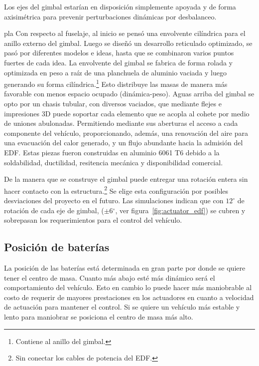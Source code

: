 \medskip 

Los ejes del gimbal estarían en disposición simplemente apoyada y de forma axisimétrica para prevenir perturbaciones dinámicas por desbalanceo.

\medskip
pla
Con respecto al fuselaje, al inicio se pensó una envolvente cilíndrica para el anillo externo del
gimbal. Luego se diseñó un desarrollo reticulado optimizado, se pasó por diferentes modelos e
ideas, hasta que se combinaron varios puntos fuertes de cada idea. La envolvente del gimbal se fabrica de forma rolada y optimizada en peso a raíz de
una planchuela de aluminio vaciada y luego generando su forma cilíndrica.\footnote{Contiene al
anillo del gimbal.} Esto distribuye las masas de manera más favorable con menos espacio
ocupado (dinámica-peso). Aguas arriba del gimbal se opto por un chasis tubular, con diversos
vaciados, que mediante flejes e impresiones 3D puede soportar cada elemento que se acopla al cohete por
medio de uniones abulonadas. Permitiendo mediante sus aberturas el acceso a cada
componente del vehículo, proporcionando, además, una renovación del aire para una
evacuación del calor generado, y un flujo abundante hacia la admisión del EDF. Estas piezas fueron construidas en aluminio 6061 T6 debido a la soldabilidad, ductilidad, resitencia mecánica y disponibilidad comercial.

\medskip

De la manera que se construye el gimbal puede entregar una rotación entera sin hacer contacto con la estructura.\footnote{Sin conectar los cables de potencia del EDF.} Se elige esta configuración por posibles desviaciones del proyecto en el
futuro. Las simulaciones indican que con $12^\circ$ de rotación de cada eje de gimbal, ($\pm$6$^\circ$, ver figura~\ref{fig:actuator_edf}) se cubren y sobrepasan los requerimientos para el control del vehículo.

\subsection{Posición de baterías}
La posición de las baterías está determinada en gran parte por donde se quiere 
tener el centro de masa. Cuanto más abajo esté más dinámico será el comportamiento
del vehículo. Esto en cambio lo puede hacer más maniobrable al costo de requerir de
mayores prestaciones en los actuadores en cuanto a velocidad de actuación para mantener el control. Si se quiere un vehículo más estable y lento para maniobrar se posiciona el centro de masa más alto.

